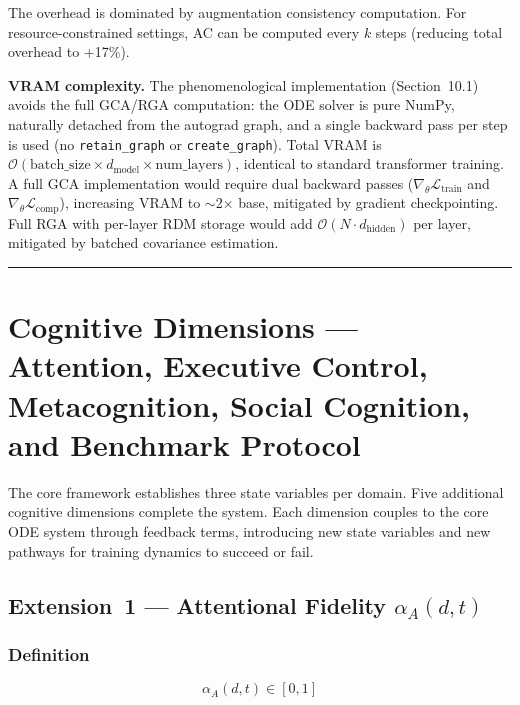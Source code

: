 \documentclass[10pt]{article}
\begin{document}
The overhead is dominated by augmentation consistency computation.
For resource-constrained settings, AC can be computed every $k$ steps
(reducing total overhead to +17\%).

\textbf{VRAM complexity.} The phenomenological implementation (Section~10.1)
avoids the full GCA/RGA computation: the ODE solver is pure NumPy, naturally
detached from the autograd graph, and a single backward pass per step is used
(no \texttt{retain\_graph} or \texttt{create\_graph}). Total VRAM is
$\mathcal{O}(\text{batch\_size} \times d_{\text{model}} \times
\text{num\_layers})$, identical to standard transformer training.
A full GCA implementation would require dual backward passes
($\nabla_\theta\mathcal{L}_{\text{train}}$ and
$\nabla_\theta\mathcal{L}_{\text{comp}}$), increasing VRAM to
$\sim$2$\times$ base, mitigated by gradient checkpointing.
Full RGA with per-layer RDM storage would add
$\mathcal{O}(N \cdot d_{\text{hidden}})$ per layer, mitigated by batched
covariance estimation.

\noindent\rule{\linewidth}{0.4pt}

\section{Cognitive Dimensions --- Attention, Executive Control,
Metacognition, Social Cognition, and Benchmark Protocol}\label{sec:cognitive-dimensions}

The core framework establishes three state variables per domain. Five
additional cognitive dimensions complete the system. Each dimension couples to the core ODE system through feedback terms, introducing new state variables and new pathways for training dynamics to succeed or fail.

\subsection{Extension~1 --- Attentional Fidelity \texorpdfstring{$\alpha_A(d,t)$}{alpha\_A(d,t)}}\label{sec:attention}

\subsubsection{Definition}
\begin{equation}\label{eq:alpha-bounds}
\alpha_A(d,t) \in [0,1]
\end{equation}
\end{document}
